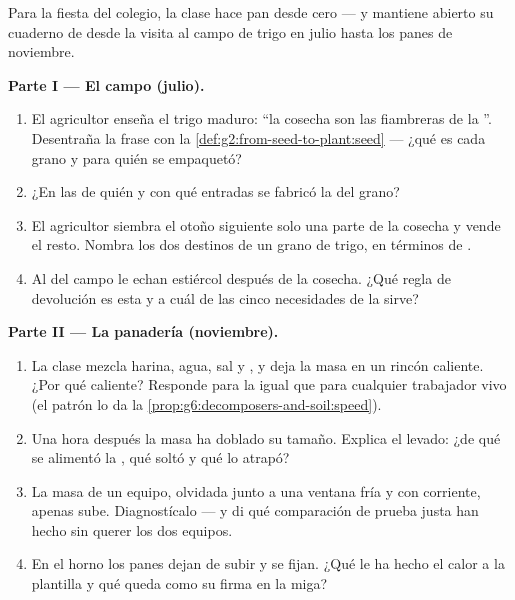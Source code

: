 \begin{problem}\label{pb:g6:producing-our-food:1}
Para la fiesta del colegio, la clase hace pan desde cero --- y mantiene
abierto su cuaderno de  desde la visita al campo de trigo en
julio hasta los panes de noviembre.

\medskip\noindent\textbf{Parte I --- El campo (julio).}
\begin{enumerate}
  \item El agricultor enseña el trigo maduro: ``la cosecha son las
        fiambreras de la ''. Desentraña la frase con la
        \cref{def:g2:from-seed-to-plant:seed} --- ¿qué es cada grano y
        para quién se empaquetó?
  \item ¿En las  de quién y con qué entradas se fabricó la  del grano?
  \item El agricultor siembra el otoño siguiente solo una parte de la
        cosecha y vende el resto. Nombra los dos destinos de un grano
        de trigo, en términos de .
  \item Al  del campo le echan estiércol después de la cosecha.
        ¿Qué regla de devolución es esta y a cuál de las cinco
        necesidades de la  sirve?
\end{enumerate}

\medskip\noindent\textbf{Parte II --- La panadería (noviembre).}
\begin{enumerate}[resume]
  \item La clase mezcla harina, agua, sal y , y deja la masa en
        un rincón caliente. ¿Por qué caliente? Responde para la
         igual que para cualquier trabajador vivo (el patrón lo
        da la \cref{prop:g6:decomposers-and-soil:speed}).
  \item Una hora después la masa ha doblado su tamaño. Explica el
        levado: ¿de qué se alimentó la , qué soltó y qué lo
        atrapó?
  \item La masa de un equipo, olvidada junto a una ventana fría y con
        corriente, apenas sube. Diagnostícalo --- y di qué comparación
        de prueba justa han hecho sin querer los dos equipos.
  \item En el horno los panes dejan de subir y se fijan. ¿Qué le ha
        hecho el calor a la plantilla y qué queda como su firma en la
        miga?
\end{enumerate}


\end{problem}
